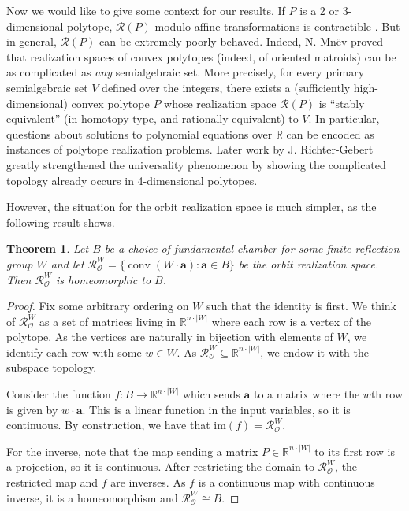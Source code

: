 \documentclass{amsart}
\newtheorem{thm}{Theorem}[section]
\theoremstyle{definition}
\newcommand{\rspace}[1]{\mathcal{R}(#1)}
\newcommand{\ospace}{\mathcal{R}_{\mathcal{O}}}
\newcommand{\bR}{\mathbb{R}}
\def\ba{\mathbf{a}}
\DeclareMathOperator{\conv}{conv}
\begin{document}
Now we would like to give some context for our results.
If $P$ is a 2 or 3-dimensional polytope, $\rspace{P}$ modulo affine transformations is contractible \cite{Steinitz1922} \cite{SteinitzRademacher76}. But in general, $\mathcal{R}(P)$ can be extremely poorly behaved. Indeed, N. Mnëv \cite{Mnev88} proved that realization spaces of convex polytopes (indeed, of oriented matroids) 
can be as complicated as \emph{any} semialgebraic set.  
More precisely, for every primary semialgebraic set $V$ defined over the integers, there exists a (sufficiently high-dimensional) convex polytope $P$ whose realization space $\mathcal{R}(P)$ is “stably equivalent” (in homotopy type, and rationally equivalent) to $V$. In particular, questions about solutions to polynomial equations over $\mathbb{R}$ can be encoded as instances of polytope realization problems. Later work by J. Richter-Gebert \cite{RichterGebertZiegler95,RichterGebert96,RichterGebert99} greatly strengthened the universality phenomenon by showing the complicated topology  already occurs in 4-dimensional polytopes.

However, the situation for the orbit realization space is much simpler, as the following result shows.

\begin{thm}\label{thm:realization-space}
    Let $B$ be a choice of fundamental chamber for some finite reflection group $W$ and let $\ospace^W=\{\conv(W\cdot \ba): \ba\in B\}$ be the orbit realization space. Then $\ospace^W$ is homeomorphic to $B$.
\end{thm}


\begin{proof}

    Fix some arbitrary ordering on $W$ such that the identity is first. We think of $\ospace^W$ as a set of matrices living in $\bR^{n\cdot |W|}$ where each row is a vertex of the polytope. As the vertices are naturally in bijection with elements of $W$, we identify each row with some $w\in W$. As $\ospace^W\subseteq \bR^{n\cdot |W|}$, we endow it with the subspace topology.
    
    Consider the function $f:B\rightarrow\bR^{n\cdot |W|}$ which sends $\ba$ to a matrix where the $w$th row is given by $w\cdot\ba$. This is a linear function in the input variables, so it is continuous. By construction, we have that $\mathrm{im}(f)=\ospace^W$.
    
    For the inverse, note that the map sending a matrix $P\in \bR^{n\cdot |W|}$ to its first row is a projection, so it is continuous. After restricting the domain to $\ospace^W$, the restricted map and $f$ are inverses. As $f$ is a continuous map with continuous inverse, it is a homeomorphism and $\ospace^W\cong B$.
\end{proof}
\end{document}

